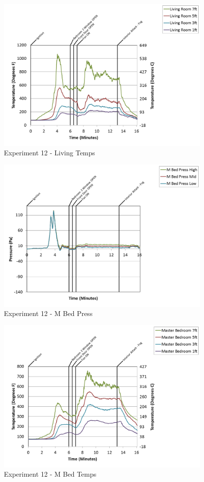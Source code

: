 \documentclass{article}
\begin{document}
\begin{appendices}
\begin{figure}[h!]
	\centering
	\includegraphics[height=3.05in]{0_Images/Results_Charts/Exp_12_Charts/LivingTemps.png}
	\caption{Experiment 12 - Living Temps}
\end{figure}

\clearpage

\begin{figure}[h!]
	\centering
	\includegraphics[height=3.05in]{0_Images/Results_Charts/Exp_12_Charts/MBedPress.png}
	\caption{Experiment 12 - M Bed Press}
\end{figure}


\begin{figure}[h!]
	\centering
	\includegraphics[height=3.05in]{0_Images/Results_Charts/Exp_12_Charts/MBedTemps.png}
	\caption{Experiment 12 - M Bed Temps}
\end{figure}


\end{appendices}
\end{document}
